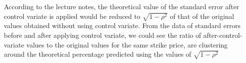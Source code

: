 According to the lecture notes, the theoretical value of the standard error after control variate is applied would be reduced to $\sqrt{1-\rho^2}$ of that of the original values obtained without using control variate. From the data of standard errors before and after applying control variate, we could see the ratio of after-control-variate values to the original values for the same strike price, are clustering around the theoretical percentage predicted using the values of $\sqrt{1-\rho^2}$

